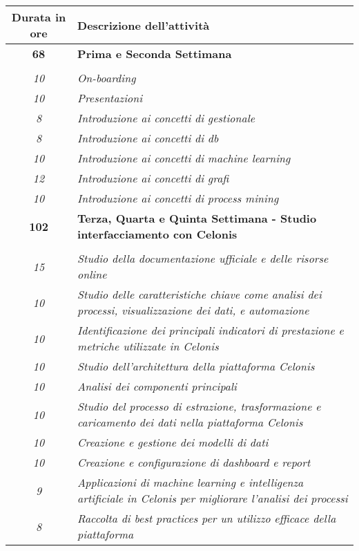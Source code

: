 

\begin{tabularx}{\textwidth}{|c|X|}
	\hline
	\textbf{Durata in ore} & \textbf{Descrizione dell'attività} \\\hline
	
	\textbf{68} & \textbf{Prima e Seconda Settimana} \\	 
\hdashline 
\multirow{7}{0cm}\\ 
\textit{10} & 
\textit{On-boarding} \\
\textit{10} & 
\textit{Presentazioni} \\
\textit{8} & 
\textit{Introduzione ai concetti di gestionale} \\
\textit{8} & 
\textit{Introduzione ai concetti di db} \\
\textit{10} & 
\textit{Introduzione ai concetti di machine learning} \\
\textit{12} & 
\textit{Introduzione ai concetti di grafi} \\
\textit{10} & 
\textit{Introduzione ai concetti di process mining} \\
\hline

\textbf{102} & \textbf{Terza, Quarta e Quinta Settimana - Studio interfacciamento con Celonis} \\ 
\hdashline 
\multirow{10}{0cm}\\ 
\textit{15} & 
\textit{Studio della documentazione ufficiale e delle risorse online} \\
\textit{10} & 
\textit{Studio delle caratteristiche chiave come analisi dei processi, visualizzazione dei dati, e automazione} \\
\textit{10} & 
\textit{Identificazione dei principali indicatori di prestazione e metriche utilizzate in Celonis} \\
\textit{10} & 
\textit{Studio dell'architettura della piattaforma Celonis} \\
\textit{10} & 
\textit{Analisi dei componenti principali} \\
\textit{10} & 
\textit{Studio del processo di estrazione, trasformazione e caricamento dei dati nella piattaforma Celonis} \\
\textit{10} & 
\textit{Creazione e gestione dei modelli di dati} \\
\textit{10} & 
\textit{Creazione e configurazione di dashboard e report} \\
\textit{9} & 
\textit{Applicazioni di machine learning e intelligenza artificiale in Celonis per migliorare l'analisi dei processi} \\
\textit{8} & 
\textit{Raccolta di best practices per un utilizzo efficace della piattaforma} \\
\hline


\end{tabularx}
